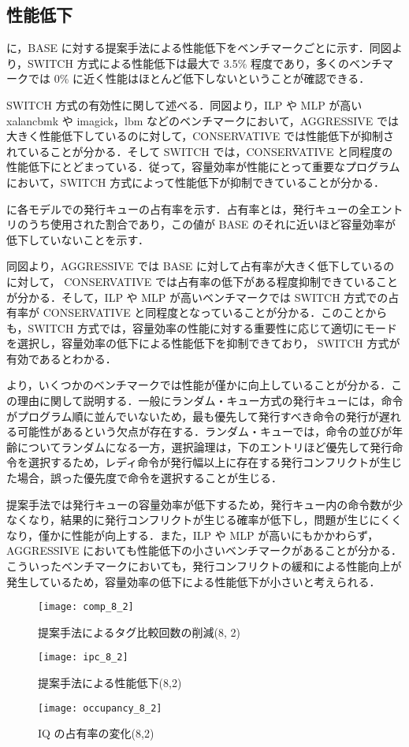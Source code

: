 \subsection{性能低下}
に，BASE に対する提案手法による性能低下をベンチマークごとに示す．同図より，SWITCH 方式による性能低下は最大で 3.5\% 程度であり，多くのベンチマークでは 0\% に近く性能はほとんど低下しないということが確認できる．

SWITCH 方式の有効性に関して述べる．同図より，ILP や MLP が高い xalancbmk や imagick，lbm などのベンチマークにおいて，AGGRESSIVE では大きく性能低下しているのに対して，CONSERVATIVE では性能低下が抑制されていることが分かる．そして SWITCH では，CONSERVATIVE と同程度の性能低下にとどまっている．従って，容量効率が性能にとって重要なプログラムにおいて，SWITCH 方式によって性能低下が抑制できていることが分かる．

に各モデルでの発行キューの占有率を示す．占有率とは，発行キューの全エントリのうち使用された割合であり，この値が BASE のそれに近いほど容量効率が低下していないことを示す．

同図より，AGGRESSIVE では BASE に対して占有率が大きく低下しているのに対して， CONSERVATIVE では占有率の低下がある程度抑制できていることが分かる．そして，ILP や MLP が高いベンチマークでは SWITCH 方式での占有率が CONSERVATIVE と同程度となっていることが分かる．このことからも，SWITCH 方式では，容量効率の性能に対する重要性に応じて適切にモードを選択し，容量効率の低下による性能低下を抑制できており， SWITCH 方式が有効であるとわかる．

より，いくつかのベンチマークでは性能が僅かに向上していることが分かる．この理由に関して説明する．一般にランダム・キュー方式の発行キューには，命令がプログラム順に並んでいないため，最も優先して発行すべき命令の発行が遅れる可能性があるという欠点が存在する．ランダム・キューでは，命令の並びが年齢についてランダムになる一方，選択論理は，下のエントリほど優先して発行命令を選択するため，レディ命令が発行幅以上に存在する発行コンフリクトが生じた場合，誤った優先度で命令を選択することが生じる．

提案手法では発行キューの容量効率が低下するため，発行キュー内の命令数が少なくなり，結果的に発行コンフリクトが生じる確率が低下し，問題が生じにくくなり，僅かに性能が向上する．また，ILP や MLP が高いにもかかわらず，AGGRESSIVE においても性能低下の小さいベンチマークがあることが分かる．こういったベンチマークにおいても，発行コンフリクトの緩和による性能向上が発生しているため，容量効率の低下による性能低下が小さいと考えられる．

\begin{figure}[htb]
  \centering
  \texttt{[image: comp\_8\_2]}
  \caption{提案手法によるタグ比較回数の削減(8, 2)}
  \label{fig:comp_8_2}
\end{figure}
\begin{figure}[htb]
  \centering
  \texttt{[image: ipc\_8\_2]}
  \caption{提案手法による性能低下(8,2)}
  \label{fig:ipc_8_2}
\end{figure}
\begin{figure}[htb]
  \centering
  \texttt{[image: occupancy\_8\_2]}
  \caption{IQ の占有率の変化(8,2)}
  \label{fig:occupancy_8_2}
\end{figure}

